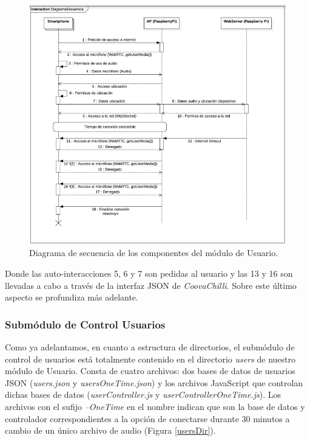 \begin{figure}[!t]
\begin{center}
\includegraphics[width=0.75\linewidth]{./5_AnalisisOrganico/Img/diagramUML.png}
\end{center}
\caption{Diagrama de secuencia de los componentes del módulo de Usuario.}
\label{diagramUML}
\end{figure}


Donde las auto-interacciones 5, 6 y 7 son pedidas al usuario y las 13 y 16 son llevadas a cabo a través de la interfaz JSON de \emph{CoovaChilli}. Sobre este último aspecto se profundiza más adelante.

\subsubsection{Submódulo de Control Usuarios} \label{userControl}

Como ya adelantamos, en cuanto a estructura de directorios, el submódulo de control de usuarios está totalmente contenido en el directorio \emph{users} de nuestro módulo de Usuario. Consta de cuatro archivos: dos bases de datos de usuarios JSON (\emph{users.json} y \emph{usersOneTime.json}) y los archivos JavaScript que controlan dichas bases de datos (\emph{userController.js} y \emph{userControllerOneTime.js}). Los archivos con el sufijo \emph{--OneTime} en el nombre indican que son la base de datos y controlador correspondientes a la opción de conectarse durante 30 minutos a cambio de un único archivo de audio (Figura \ref{usersDir}).

